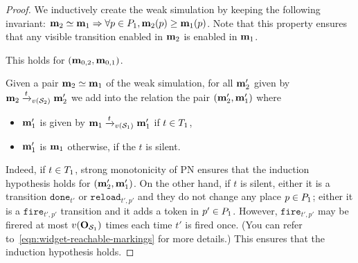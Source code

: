 \begin{proof}
  We inductively create the weak simulation by keeping the following invariant:
  \( \mathbf{m}_2 \simeq \mathbf{m}_1 \Rightarrow \forall p \in P_1, \mathbf{m}_2(p) \geq \mathbf{m}_1(p) \).
  Note that this property ensures that any visible transition enabled in $\mathbf{m}_2$ is enabled in $\mathbf{m}_1$.
  
  This holds for $(\mathbf{m}_{0,2}, \mathbf{m}_{0,1})$.

  Given a pair $\mathbf{m}_2 \simeq \mathbf{m}_1$ of the weak simulation, for all $\mathbf{m}'_2$ given by
  $\mar_2 \fire[{\val(\namePPN[2])}]{t} \mar'_2$
  we add into the relation the pair $(\mathbf{m}'_2, \mathbf{m}'_1)$ where
  \begin{itemize}
    \item $\mathbf{m}'_1$ is given by $\mar_1 \fire[{\val(\namePPN[1])}]{t} \mar'_1$ if $t \in T_1$,
    \item $\mathbf{m}'_1$ is $\mathbf{m}_1$ otherwise,  if the $t$ is silent.
  \end{itemize}

  Indeed, if $t \in T_1$, strong monotonicity of \ac{PN} ensures that the induction hypothesis holds for $(\mathbf{m}'_2, \mathbf{m}'_1)$.
  On the other hand, if $t$ is silent, either it is a transition $\mathtt{done}_{t'}$ or $\mathtt{reload}_{t',p'}$ and they do not change any place $p \in P_1$; either it is a $\mathtt{fire}_{t',p'}$ transition and it adds a token in $p' \in P_1$.
  However, $\mathtt{fire}_{t',p'}$ may be firered at most $\val[{\outm[{\namePPN[1]}]}]$ times each time $t'$ is fired once.
  (You can refer to~\cref{eqn:widget-reachable-markings} for more details.)
  This ensures that the induction hypothesis holds.
\end{proof}

